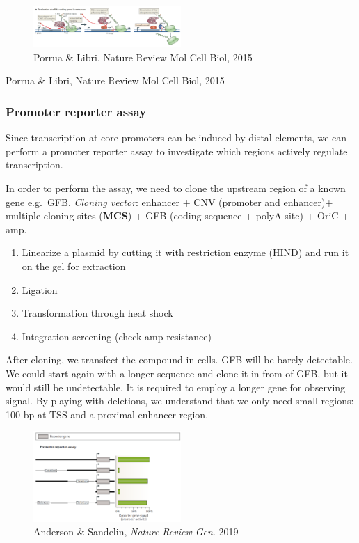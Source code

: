 \begin{figure}
\centering
\includegraphics[width=0.5\textwidth]{../_resources/Screenshot_2022-10-10_at_10-38-48.png}
\caption{Porrua \& Libri, Nature Review Mol Cell Biol, 2015}
\end{figure}

Porrua \& Libri, Nature Review Mol Cell Biol, 2015

\hypertarget{promoter-reporter-assay}{%
\subsubsection{Promoter reporter assay}\label{promoter-reporter-assay}}

Since transcription at core promoters can be induced by distal elements, we can perform a promoter reporter assay to investigate which regions actively regulate transcription.

In order to perform the assay, we need to clone the upstream region of a known gene e.g.~GFB. \emph{Cloning vector}: enhancer + CNV (promoter and enhancer)+ multiple cloning sites (\textbf{MCS}) + GFB (coding sequence + polyA site) + OriC + amp.

\begin{enumerate}
\def\labelenumi{\arabic{enumi}.}
\tightlist
\item
  Linearize a plasmid by cutting it with restriction enzyme (HIND) and run it on the gel for extraction
\item
  Ligation
\item
  Transformation through heat shock
\item
  Integration screening (check amp resistance)
\end{enumerate}

After cloning, we transfect the compound in cells. GFB will be barely detectable. We could start again with a longer sequence and clone it in from of GFB, but it would still be undetectable. It is required to employ a longer gene for observing signal. By playing with deletions, we understand that we only need small regions: 100 bp at TSS and a proximal enhancer region.

\begin{figure}
\centering
\includegraphics[width=0.5\textwidth]{../_resources/Screenshot_2022-10-10_at_10-45-54.png}
\caption{Anderson \& Sandelin, \emph{Nature Review Gen}. 2019}
\end{figure}

